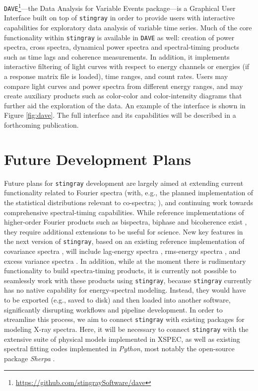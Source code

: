 \documentclass[twocolumn]{aastex62}
\newcommand{\stingray}{\texttt{stingray}\xspace}
\newcommand{\dave}{\texttt{DAVE}\xspace}
\begin{document}
\dave\footnote{\url{https://github.com/stingraySoftware/dave}}---the Data Analysis for Variable Events package---is a Graphical User Interface built on top of \stingray in order to provide users with interactive capabilities for exploratory data analysis of variable time series. 
Much of the core functionality within \stingray is available in \dave as well: creation of power spectra, cross spectra, dynamical power spectra and spectral-timing products such as time lags and coherence measurements. 
In addition, it implements interactive filtering of light curves with respect to energy channels or energies (if a response matrix file is loaded), time ranges, and count rates. 
Users may compare light curves and power spectra from different energy ranges, and may create auxiliary products such as color-color and color-intensity diagrams that further aid the exploration of the data. 
An example of the interface is shown in Figure \ref{fig:dave}. 
The full interface and its capabilities will be described in a forthcoming publication. 



\section{Future Development Plans}
\label{sec:future}

Future plans for \stingray development are largely aimed at extending current functionality related to Fourier spectra (with, e.g., the planned implementation of the statistical distributions relevant to co-spectra; \citealt{huppenkothen2017}), and continuing work towards comprehensive spectral-timing capabilities. 
While reference implementations of higher-order Fourier products such as bispectra, biphase and bicoherence exist \citep{maccarone2002,maccarone2005,maccarone2013}, they require additional extensions to be useful for science. 
New key features in the next version of \stingray, based on an existing reference implementation of covariance spectra \citep{WilkinsonUttley09}, will include lag-energy spectra \citep{Vaughanetal94}, rms-energy spectra \citep{Revnivtsevetal99}, and excess variance spectra \citep{Vaughanetal03}. 
In addition, while at the moment there is rudimentary functionality to build spectra-timing products, it is currently not possible to seamlessly work with these products using \stingray, because \stingray currently has no native capability for energy-spectral modeling. 
Instead, they would have to be exported (e.g., saved to disk) and then loaded into another software, significantly disrupting workflows and pipeline development. 
In order to streamline this process, we aim to connect \stingray with existing packages for modeling X-ray spectra. 
Here, it will be necessary to connect \stingray with the extensive suite of physical models implemented in XSPEC, as well as existing spectral fitting codes implemented in \textit{Python}, most notably the open-source package \textit{Sherpa} \citep{sherpa}.
\end{document}
